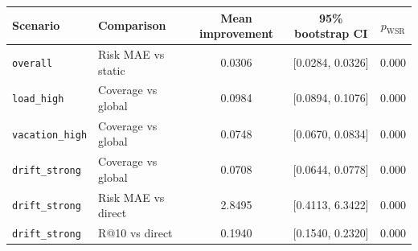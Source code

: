 \begin{tabular}{llccc}
\hline
Scenario & Comparison & Mean improvement & 95\% bootstrap CI & $p_{\mathrm{WSR}}$ \\
\hline
\texttt{overall} & Risk MAE vs static & 0.0306 & [0.0284, 0.0326] & 0.000 \\
\texttt{load\_high} & Coverage vs global & 0.0984 & [0.0894, 0.1076] & 0.000 \\
\texttt{vacation\_high} & Coverage vs global & 0.0748 & [0.0670, 0.0834] & 0.000 \\
\texttt{drift\_strong} & Coverage vs global & 0.0708 & [0.0644, 0.0778] & 0.000 \\
\texttt{drift\_strong} & Risk MAE vs direct & 2.8495 & [0.4113, 6.3422] & 0.000 \\
\texttt{drift\_strong} & R@10 vs direct & 0.1940 & [0.1540, 0.2320] & 0.000 \\
\hline
\end{tabular}
